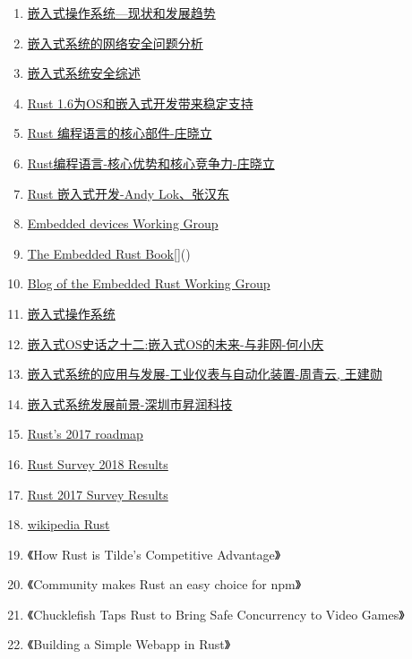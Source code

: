 \documentclass[12pt, a4paper]{article}
\begin{document}
\begin{enumerate}
	\item \href{https://wenku.baidu.com/view/7c7bab64caaedd3382c4d301}{嵌入式操作系统---现状和发展趋势} 
	\item \href{https://www.jianshu.com/p/866a9c757f72}{嵌入式系统的网络安全问题分析}
	\item \href{http://www.xml-data.org/whdy/html/dec010e3-2734-4788-a199-2fa04f09b9d7.htm#rhhz}{嵌入式系统安全综述}
	\item \href{https://www.open-open.com/news/view/121b0b3}{Rust 1.6为OS和嵌入式开发带来稳定支持} 
	\item \href{https://www.infoq.cn/article/rust-core-components}{Rust 编程语言的核心部件-庄晓立}
	\item \href{https://docs.huihoo.com/infoq/qconbeijing/2016/day3/%E7%BC%96%E7%A8%8B%E8%AF%AD%E8%A8%80%E5%AE%9E%E6%88%98%E4%B8%93%E9%A2%98/3-2-Rust%E8%AF%AD%E8%A8%80%E6%A0%B8%E5%BF%83%E7%AB%9E%E4%BA%89%E5%8A%9B-%E5%BA%84%E6%99%93%E7%AB%8B.pdf}{Rust编程语言-核心优势和核心竞争力-庄晓立}
	\item \href{https://zhuanlan.zhihu.com/embedded-rust}{Rust 嵌入式开发-Andy Lok、张汉东} 
	\item \href{https://github.com/rust-embedded/wg}{Embedded devices Working Group}
	\item \href{https://docs.rust-embedded.org/book/}{The Embedded Rust Book}[]()  
	\item \href{https://rust-embedded.github.io/blog/}{Blog of the Embedded Rust Working Group}
	\item \href{https://baike.baidu.com/item/%E5%B5%8C%E5%85%A5%E5%BC%8F%E6%93%8D%E4%BD%9C%E7%B3%BB%E7%BB%9F#7}{嵌入式操作系统} 
	\item \href{http://www.embeddedlinux.org.cn/html/xinshourumen/201408/15-3012.html}{嵌入式OS史话之十二:嵌入式OS的未来-与非网-何小庆}
	\item \href{http://210.42.35.80/G2S/eWebEditor/uploadfile/20131204120158007.pdf}{嵌入式系统的应用与发展-工业仪表与自动化装置-周青云, 王建勋}
	\item \href{http://www.sohu.com/a/158359113_404276}{嵌入式系统发展前景-深圳市昇润科技}  
	\item \href{https://blog.rust-lang.org/2017/07/05/Rust-Roadmap-Update.html}{Rust's 2017 roadmap}
	\item \href{https://blog.rust-lang.org/2018/11/27/Rust-survey-2018.html}{Rust Survey 2018 Results}
	\item \href{https://blog.rust-lang.org/2017/09/05/Rust-2017-Survey-Results.html}{Rust 2017 Survey Results}
	\item \href{https://en.wikipedia.org/wiki/Rust}{wikipedia Rust}
	\item 《How Rust is Tilde’s Competitive Advantage》
	\item 《Community makes Rust an easy choice for npm》
	\item 《Chucklefish Taps Rust to Bring Safe Concurrency to Video Games》
	\item 《Building a Simple Webapp in Rust》
\end{enumerate}
\end{document}
